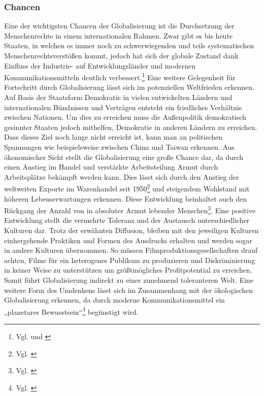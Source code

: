 \documentclass[12pt]{article}
\begin{document}
\subsubsection{Chancen}
Eine der wichtigsten Chancen der Globalisierung ist die Durchsetzung der Menschenrechte in einem internationalen Rahmen. Zwar gibt es bis heute Staaten, in welchen es immer noch zu schwerwiegenden und teils systematischen Menschenrechtsverstößen kommt, jedoch hat sich der globale Zustand dank Einfluss der Industrie- auf Entwicklungsländer und modernen Kommunikationsmitteln deutlich verbessert.\footnote{Vgl. \cite{Lohrmann} und \cite{WikipMenschRechte}} 
Eine weitere Gelegenheit für Fortschritt durch Globalisierung lässt sich im potenziellen Weltfrieden erkennen. Auf Basis der Staatsform Demokratie in vielen entwickelten Ländern und internationalen Bündnissen und Verträgen entsteht ein friedliches Verhältnis zwischen Nationen. Um dies zu erreichen muss die Außenpolitik demokratisch gesinnter Staaten jedoch mithelfen, Demokratie in anderen Ländern zu erreichen. Dass dieses Ziel noch lange nicht erreicht ist, kann man an politischen Spannungen wie beispielsweise zwischen China und Taiwan erkennen.
Aus ökonomischer Sicht stellt die Globalisierung eine große Chance dar, da durch einen Anstieg im Handel und verstärkte Arbeitsteilung Armut durch Arbeitsplätze bekämpft werden kann. Dies lässt sich durch den Anstieg der weltweiten Exporte im Warenhandel seit 1950\footnote{Vgl. \cite{Urmersbach2021}} und steigendem Wohlstand mit höheren Lebenserwartungen erkennen. Diese Entwicklung beinhaltet auch den Rückgang der Anzahl von in absoluter Armut lebender Menschen\footnote{Vgl. \cite{Roser2016}}.
Eine positive Entwicklung stellt die vermehrte Toleranz und der Austausch unterschiedlicher Kulturen dar. Trotz der erwähnten Diffusion, bleiben mit den jeweiligen Kulturen einhergehende Praktiken und Formen des Ausdrucks erhalten und werden sogar in andere Kulturen übernommen. So müssen Filmproduktionsgesellschaften drauf achten, Filme für ein heterogenes Publikum zu produzieren und Diskriminierung in keiner Weise zu unterstützen um größtmögliches Profitpotential zu erreichen. Somit führt Globalisierung indirekt zu einer zunehmend toleranteren Welt. Eine weitere Form des Umdenkens lässt sich im Zusammenhang mit der ökologischen Globalisierung erkennen, da durch moderne Kommunikationsmittel ein „planetares Bewusstsein“\footnote{Vgl. \cite{WikipGlobWirtsch}} begünstigt wird.
\end{document}

